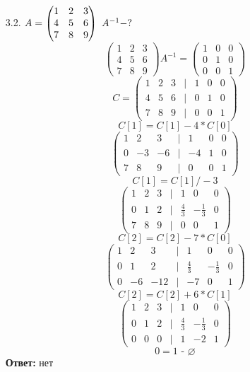 \documentclass[a4paper]{article}
\newcommand{\mat}[1]{\begin{pmatrix} #1 \end{pmatrix}}
\renewcommand{\f}[2]{\frac{#1}{#2}}
\newcommand{\ts}{\text{\space}}
\begin{document}
\begin{enumerate}
\begin{enumerate}
        \item[3.2.]
        $A = \mat{1 & 2 & 3 \\ 4 & 5 & 6 \\ 7 & 8 & 9 } \ts A^{-1}-?$
        $$\mat{1 & 2 & 3 \\ 4 & 5 & 6 \\ 7 & 8 & 9 }A^{-1}=\mat{1 & 0 & 0 \\ 0 & 1 & 0 \\ 0 & 0 & 1}$$
        $$C = \mat{1 & 2 & 3 & | & 1 & 0 & 0 \\ 4 & 5 & 6 & | & 0 & 1 & 0 \\ 7 & 8 & 9 & | & 0 & 0 & 1}$$
        $$C[1] = C[1]-4*C[0]$$
        $$\mat{1 & 2 & 3 & | & 1 & 0 & 0 \\ 0 & -3 & -6 & | & -4 & 1 & 0 \\ 7 & 8 & 9 & | & 0 & 0 & 1}$$
        $$C[1] = C[1]/-3$$
        $$\mat{1 & 2 & 3 & | & 1 & 0 & 0 \\ 0 & 1 & 2 & | & \f{4}{3} & -\f{1}{3} & 0 \\ 7 & 8 & 9 & | & 0 & 0 & 1}$$
        $$C[2] = C[2] - 7*C[0]$$
        $$\mat{1 & 2 & 3 & | & 1 & 0 & 0 \\ 0 & 1 & 2 & | & \f{4}{3} & -\f{1}{3} & 0 \\ 0 & -6 & -12 & | & -7 & 0 & 1}$$
        $$C[2] = C[2] + 6*C[1]$$
        $$\mat{1 & 2 & 3 & | & 1 & 0 & 0 \\ 0 & 1 & 2 & | & \f{4}{3} & -\f{1}{3} & 0 \\ 0 & 0 & 0 & | & 1 & -2 & 1}$$
        $$0 = 1 \text{ - } \varnothing$$
        \textbf{Ответ: } нет


\end{enumerate}
\end{enumerate}
\end{document}
